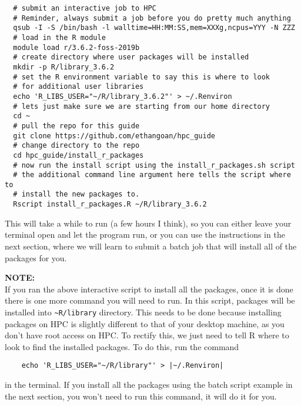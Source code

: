 \begin{verbatim}
  # submit an interactive job to HPC
  # Reminder, always submit a job before you do pretty much anything
  qsub -I -S /bin/bash -l walltime=HH:MM:SS,mem=XXXg,ncpus=YYY -N ZZZ
  # load in the R module
  module load r/3.6.2-foss-2019b
  # create directory where user packages will be installed
  mkdir -p R/library_3.6.2
  # set the R environment variable to say this is where to look
  # for additional user libraries
  echo 'R_LIBS_USER="~/R/library_3.6.2"' > ~/.Renviron
  # lets just make sure we are starting from our home directory
  cd ~
  # pull the repo for this guide
  git clone https://github.com/ethangoan/hpc_guide
  # change directory to the repo
  cd hpc_guide/install_r_packages
  # now run the install script using the install_r_packages.sh script
  # the additional command line argument here tells the script where to
  # install the new packages to.
  Rscript install_r_packages.R ~/R/library_3.6.2
\end{verbatim}
%
%
%
\par
%
%
%
This will take a while to run (a few hours I think), so you can either leave your terminal open and let the program run, or you can use the instructions in the next section, where we will learn to submit a batch job that will install all of the packages for you.
%
\begin{story}
  \textbf{NOTE:}
  \\
  If you ran the above interactive script to install all the packages, once it is done there is one more command you will need to run. In this script, packages will be installed into \texttt{\textasciitilde R/library} directory. This needs to be done because installing packages on HPC is slightly different to that of your desktop machine, as you don't have root access on HPC. To rectify this, we just need to tell R where to look to find the installed packages. To do this, run the command
  \\
  \begin{verbatim}
    echo 'R_LIBS_USER="~/R/library"' > |~/.Renviron|
  \end{verbatim}
  in the terminal. If you install all the packages using the batch script example in the next section, you won't need to run this command, it will do it for you.
\end{story}
%
%
%
%
